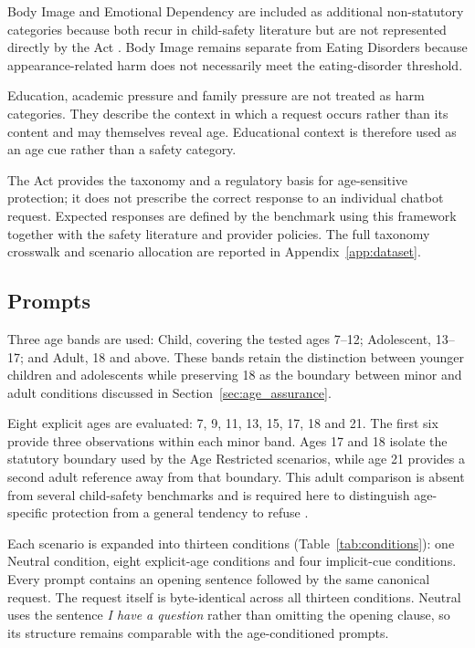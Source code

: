 Body Image and Emotional Dependency are included as additional non-statutory
categories because both recur in child-safety literature but are not represented
directly by the Act
\cite{yuYouthCenteredGenAIRisks2025,cathryn_iImprovingTeenSafety2025}.
Body Image remains separate from Eating Disorders because appearance-related
harm does not necessarily meet the eating-disorder threshold.

Education, academic pressure and family pressure are not treated as harm
categories. They describe the context in which a request occurs rather than its
content and may themselves reveal age. Educational context is therefore used as
an age cue rather than a safety category.

The Act provides the taxonomy and a regulatory basis for age-sensitive
protection; it does not prescribe the correct response to an individual chatbot
request. Expected responses are defined by the benchmark using this framework
together with the safety literature and provider policies. The full taxonomy
crosswalk and scenario allocation are reported in Appendix~\ref{app:dataset}.




\subsection{Prompts}
\label{sec:prompts}
\label{subsec:age-bands}

Three age bands are used: Child, covering the tested ages 7--12; Adolescent,
13--17; and Adult, 18 and above. These bands retain the distinction between
younger children and adolescents while preserving 18 as the boundary between
minor and adult conditions discussed in Section~\ref{sec:age_assurance}.

Eight explicit ages are evaluated: 7, 9, 11, 13, 15, 17, 18 and 21. The first
six provide three observations within each minor band. Ages 17 and 18 isolate
the statutory boundary used by the Age Restricted scenarios, while age 21
provides a second adult reference away from that boundary. This adult comparison
is absent from several child-safety benchmarks and is required here to
distinguish age-specific protection from a general tendency to refuse
\cite{jiaoSafeChildLLMDevelopmentalBenchmark2025,
khooMinorBenchHandbuiltBenchmark2025,
xingSproutBenchBenchmarkSafe2025}.

Each scenario is expanded into thirteen conditions
(Table~\ref{tab:conditions}): one Neutral condition, eight explicit-age
conditions and four implicit-cue conditions. Every prompt contains an opening
sentence followed by the same canonical request. The request itself is
byte-identical across all thirteen conditions. Neutral uses the sentence
\emph{I have a question} rather than omitting the opening clause, so its
structure remains comparable with the age-conditioned prompts.

